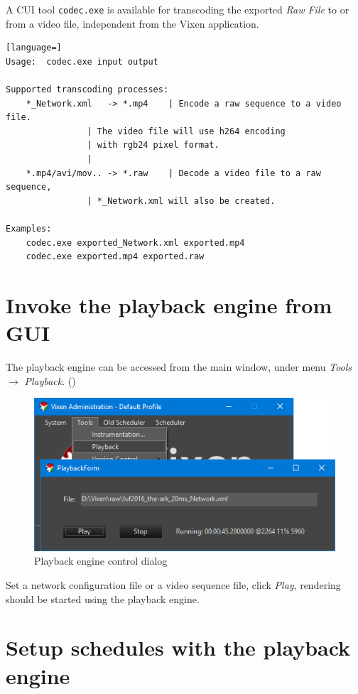 A CUI tool \texttt{codec.exe} is available for transcoding the exported \textit{Raw File} to or from a video file, independent from the Vixen application.

\renewcommand{\baselinestretch}{1}
\begin{lstlisting}[language=]
Usage:  codec.exe input output

Supported transcoding processes:
    *_Network.xml   -> *.mp4	| Encode a raw sequence to a video file.
				| The video file will use h264 encoding
				| with rgb24 pixel format.
				|
    *.mp4/avi/mov.. -> *.raw	| Decode a video file to a raw sequence,
				| *_Network.xml will also be created.

Examples:
    codec.exe exported_Network.xml exported.mp4
    codec.exe exported.mp4 exported.raw
\end{lstlisting}
\renewcommand{\baselinestretch}{\mystretch}

\section{Invoke the playback engine from GUI}

The playback engine can be accessed from the main window, under menu \textit{Tools} $\rightarrow$ \textit{Playback}. ()

\begin{figure}[!htb]
  \centering
  \includegraphics[width=0.7\columnwidth]{Figs/vixen_playback.png}
  \caption{\footnotesize Playback engine control dialog}
  \label{fig:guide_playback}
\end{figure}

Set a network configuration file or a video sequence file, click \textit{Play}, rendering should be started using the playback engine.

\section{Setup schedules with the playback engine}

